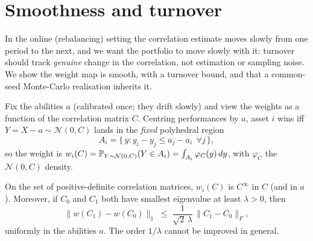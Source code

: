 \section{Smoothness and turnover}
\label{sec:smoothness}

In the online (rebalancing) setting the correlation estimate moves slowly from
one period to the next, and we want the portfolio to move slowly with it:
turnover should track \emph{genuine} change in the correlation, not estimation
or sampling noise. We show the weight map is smooth, with a turnover bound, and
that a common-seed Monte-Carlo realisation inherits it.

Fix the abilities $a$ (calibrated once; they drift slowly) and view the weights
as a function of the correlation matrix $C$. Centring performances by $a$, asset
$i$ wins iff $Y = X - a \sim \mathcal{N}(0, C)$ lands in the \emph{fixed}
polyhedral region
\begin{equation}
  A_i = \{\, y : y_i - y_j \le a_j - a_i \ \ \forall j \,\},
  \label{eq:wincone}
\end{equation}
so the weight is
$w_i(C) = \mathbb{P}_{Y\sim\mathcal{N}(0,C)}(Y\in A_i) = \int_{A_i}\varphi_C(y)\,dy$,
with $\varphi_C$ the $\mathcal{N}(0,C)$ density.

\begin{theorem}[Smoothness]
\label{thm:smooth}
On the set of positive-definite correlation matrices, $w_i(C)$ is
$C^\infty$ in $C$ (and in $a$). Moreover, if $C_0$ and $C_1$ both have smallest
eigenvalue at least $\lambda > 0$, then
\begin{equation}
  \|w(C_1) - w(C_0)\|_1 \;\le\; \frac{1}{\sqrt2\,\lambda}\,\|C_1 - C_0\|_F,
  \label{eq:lip}
\end{equation}
uniformly in the abilities $a$. The order $1/\lambda$ cannot be improved in
general.
\end{theorem}

